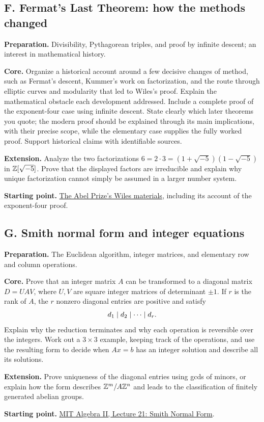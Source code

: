 \begin{capstoneproject}
\subsection*{F. Fermat's Last Theorem: how the methods changed}
\textbf{Preparation.} Divisibility, Pythagorean triples, and proof by
infinite descent; an interest in mathematical history.

\textbf{Core.} Organize a historical account around a few decisive changes
of method, such as Fermat's descent, Kummer's work on factorization, and
the route through elliptic curves and modularity that led to Wiles's
proof. Explain the mathematical obstacle each development addressed.
Include a complete proof of the exponent-four case using infinite
descent. State clearly which later theorems you quote; the modern proof
should be explained through its main implications, with their precise
scope, while the elementary case supplies the fully worked proof.
Support historical claims with identifiable sources.

\textbf{Extension.} Analyze the two factorizations
$6=2\cdot3=(1+\sqrt{-5})(1-\sqrt{-5})$ in $\mathbb Z[\sqrt{-5}]$.
Prove that the displayed factors are irreducible and explain why unique
factorization cannot simply be assumed in a larger number system.

\textbf{Starting point.}
\href{https://abelprize.no/abel-prize-laureates/2016}{The Abel Prize's
Wiles materials}, including its account of the exponent-four proof.

\end{capstoneproject}

\begin{capstoneproject}
\subsection*{G. Smith normal form and integer equations}
\textbf{Preparation.} The Euclidean algorithm, integer matrices, and
elementary row and column operations.

\textbf{Core.} Prove that an integer matrix $A$ can be transformed to a
diagonal matrix $D=UAV$, where $U,V$ are square integer matrices of
determinant $\pm1$. If $r$ is the rank of $A$, the $r$ nonzero diagonal
entries are positive and satisfy
\[
  d_1\mid d_2\mid\cdots\mid d_r.
\]
Explain why the reduction terminates and why each operation is reversible
over the integers. Work out a $3\times3$ example, keeping track of the
operations, and use the resulting form to decide when $Ax=b$ has an
integer solution and describe all its solutions.

\textbf{Extension.} Prove uniqueness of the diagonal entries using gcds
of minors, or explain how the form describes
$\mathbb Z^m/A\mathbb Z^n$ and leads to the classification of finitely generated
abelian groups.

\textbf{Starting point.}
\href{https://ocw.mit.edu/courses/res-18-012-algebra-ii-student-notes-spring-2022/mit18_702s22_lect21.pdf}{MIT Algebra II, Lecture 21: Smith Normal Form}.

\end{capstoneproject}

